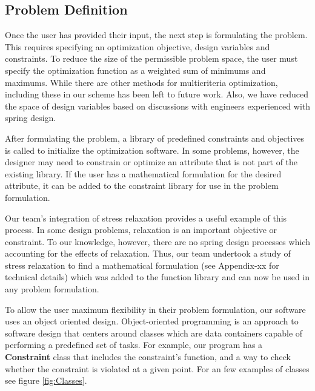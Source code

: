 \documentclass[10pt]{article}
\begin{document}
\subsection{Problem Definition}
\label{sec:Problem_Definition}

Once the user has provided their input, the next step is formulating the problem.  This requires specifying an optimization objective, design variables and constraints.  To reduce the size of the permissible problem space, the user must specify the optimization function as a weighted sum of minimums and maximums.  While there are other methods for multicriteria optimization, including these in our scheme has been left to future work.  Also, we have reduced the space of design variables based on discussions with engineers experienced with spring design.

After formulating the problem, a library of predefined constraints and objectives is called to initialize the optimization software.  In some problems, however, the designer may need to constrain or optimize an attribute that is not part of the existing library.  If the user has a mathematical formulation for the desired attribute, it can be added to the constraint library for use in the problem formulation.

Our team's integration of stress relaxation provides a useful example of this process.  In some design problems, relaxation is an important objective or constraint.  To our knowledge, however, there are no spring design processes which accounting for the effects of relaxation.  Thus, our team undertook a study of stress relaxation to find a mathematical formulation (see Appendix-xx for technical details) which was added to the function library and can now be used in any problem formulation.

To allow the user maximum flexibility in their problem formulation, our software uses an object oriented design.  Object-oriented programming is an approach to software design that centers around classes which are data containers capable of performing a predefined set of tasks.  For example, our program has a \textbf{Constraint} class that includes the constraint's function, and a way to check whether the constraint is violated at a given point. For an few examples of classes see figure \ref{fig:Classes}. 
\end{document}
